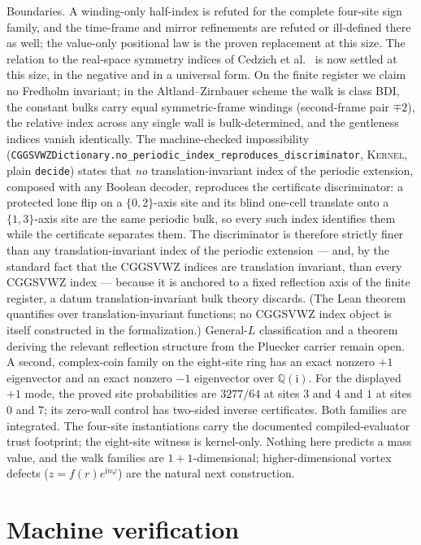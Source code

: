 \documentclass[11pt]{article}
\newcommand{\ii}{\mathrm{i}}
\newcommand{\Kernel}{\textcolor{kernelcolor}{\textsc{Kernel}}}
\begin{document}
Boundaries.  A winding-only half-index is refuted for the complete four-site
sign family, and the time-frame and mirror refinements are refuted or
ill-defined there as well; the value-only positional law is the proven
replacement at this size.  The relation to the real-space symmetry
indices of Cedzich et al.\ \cite{Cedzich,CedzichBulkEdge} is now settled
at this size, in the negative and in a universal form.  On the finite
register we claim no Fredholm invariant; in the Altland--Zirnbauer
scheme the walk is class BDI, the constant bulks carry equal
symmetric-frame windings (second-frame pair $\mp2$), the relative index
across any single wall is bulk-determined, and the gentleness indices
vanish identically.  The machine-checked impossibility
(\texttt{CGGSVWZDictionary.no\_periodic\_index\_reproduces\_discriminator},
\Kernel{}, plain \texttt{decide}) states that \emph{no}
translation-invariant index of the periodic extension, composed with any
Boolean decoder, reproduces the certificate discriminator: a protected
lone flip on a $\{0,2\}$-axis site and its blind one-cell translate onto
a $\{1,3\}$-axis site are the same periodic bulk, so every such index
identifies them while the certificate separates them.  The
discriminator is therefore strictly finer than any translation-invariant
index of the periodic extension --- and, by the standard fact that the
CGGSVWZ indices are translation invariant, than every CGGSVWZ index ---
because it is anchored to a fixed reflection axis of the finite
register, a datum translation-invariant bulk theory discards.  (The
Lean theorem quantifies over translation-invariant functions; no CGGSVWZ
index object is itself constructed in the formalization.)  General-$L$
classification and a theorem deriving the relevant reflection structure
from the Pluecker carrier remain open.  A second, complex-coin family on the eight-site ring has an
exact nonzero $+1$ eigenvector and an exact nonzero $-1$ eigenvector over
$\mathbb{Q}(\mathrm{i})$.  For the displayed $+1$ mode, the proved site
probabilities are $3277/64$ at sites 3 and 4 and $1$ at sites 0 and 7; its
zero-wall control has two-sided inverse certificates.  Both families are
integrated.  The four-site instantiations carry the documented
compiled-evaluator trust footprint; the eight-site witness is kernel-only.
Nothing here predicts a mass value, and the walk families are
$1{+}1$-dimensional; higher-dimensional vortex defects
($z=f(r)e^{\ii n\varphi}$) are the natural next construction.

\appendix
\section{Machine verification}
\end{document}
